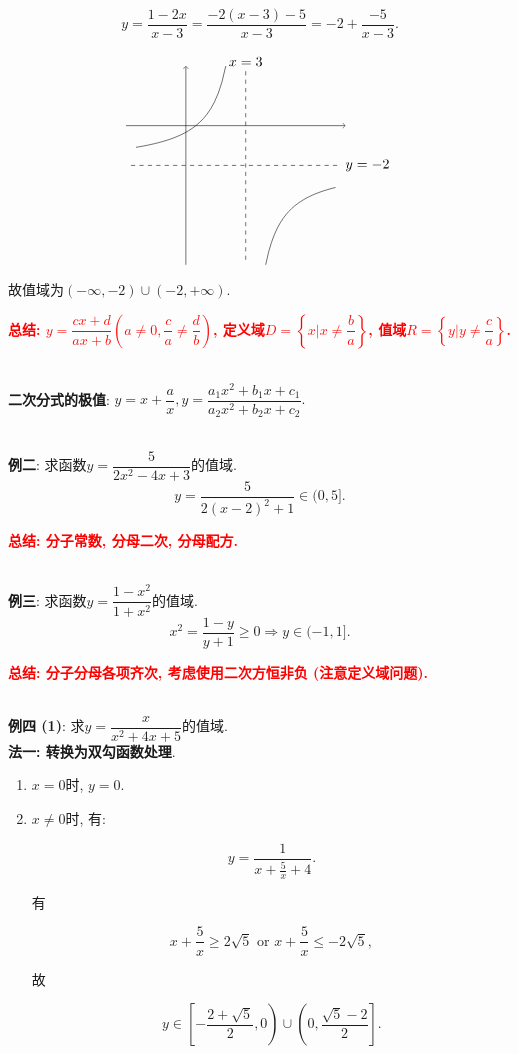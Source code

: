 \documentclass[8pt]{article}
\begin{document}
					$$y=\frac{1-2x}{x-3}=\frac{-2(x-3)-5}{x-3}=-2+\frac{-5}{x-3}.$$

					$$
					\begin{tikzpicture}[scale=0.5]
			    		\draw[black, ->] (-3,  0)--( 8,  0);
			    		\draw[black, ->] (0, -7)--( 0, 3);
			    		\draw[black, domain=-2.5:2] plot(\x, {(2*\x-1)/(3-\x)});
			    		\draw[black, domain=4:7.5] plot(\x, {(2*\x-1)/(3-\x)});
			    		\draw[black, dashed] (-2.75, -2)--(7.75, -2) node[right] {$y=-2$};
			    		\draw[black, dashed] (3, -6.75)--(3, 2.75) node[above] {$x=3$};
			    	\end{tikzpicture}$$

			    	故值域为$(-\infty, -2)\cup(-2, +\infty).$

					\textbf{\textcolor{red}{总结: $y=\dfrac{cx+d}{ax+b} (a\neq 0, \dfrac{c}{a} \neq \dfrac{d}{b})$, 定义域$D=\left\{x|x\neq\dfrac{b}{a}\right\}$, 值域$R=\left\{y|y\neq\dfrac{c}{a}\right\}$.}}

				~\\

				\textbf{二次分式的极值}: $y=x+\dfrac{a}{x}, y=\dfrac{a_1x^2+b_1x+c_1}{a_2x^2+b_2x+c_2}.$

				~\\

				\textbf{例二}: 求函数$y=\dfrac{5}{2x^2-4x+3}$的值域.
					~\\

					$$y=\frac{5}{2(x-2)^2+1}\in(0, 5].$$

					\textbf{\textcolor{red}{总结: 分子常数, 分母二次, 分母配方.}}

				~\\

				\textbf{例三}: 求函数$y=\dfrac{1-x^2}{1+x^2}$的值域.
					~\\

					$$x^2=\frac{1-y}{y+1}\geq 0\Rightarrow y\in(-1, 1].$$

					\textbf{\textcolor{red}{总结: 分子分母各项齐次, 考虑使用二次方恒非负 (注意定义域问题).}}

				~\\

				\textbf{例四 (1)}: 求$y=\dfrac{x}{x^2+4x+5}$的值域.
					~\\

					\textbf{法一: 转换为双勾函数处理}.

					\begin{enumerate}[label=$\arabic*^{\circ}$]
						\item $x=0$时, $y=0$.
						\item $x\neq 0$时, 有:

							$$y=\frac{1}{x+\frac{5}{x}+4}.$$

							有

							$$x+\frac{5}{x} \geq 2\sqrt{5} \text{ or } x+\frac{5}{x} \leq -2\sqrt{5},$$

							故

							$$y\in\left[-\frac{2+\sqrt{5}}{2}, 0\right)\cup\left(0, \frac{\sqrt{5}-2}{2}\right].$$

					\end{enumerate}
\end{document}

